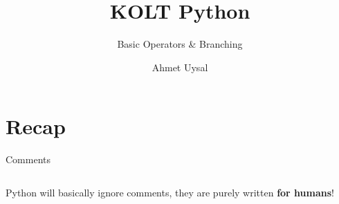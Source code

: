 

\usepackage{../KU-Beamer-Template/style/koc} 
\usepackage{minted}
\usepackage{upquote}
 
\title{KOLT Python} 
\subtitle{Basic Operators \& Branching} 
\date{}
\author{Ahmet Uysal}




    \maketitle

    \section{Recap}

        \begin{frame}{Comments}
            \LARGE
            \inputminted[frame=single,framesep=2pt]{python3}{../Lecture1/code-examples/comments.py}
            Python will basically ignore comments, they are purely written \textbf{for humans}!
        \end{frame}

